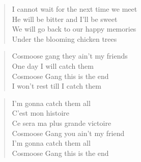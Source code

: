 \begin{verse}
I cannot wait for the next time we meet\\
He will be bitter and I'll be sweet\\
We will go back to our happy memories\\
Under the blooming chicken trees
\end{verse}

\begin{verse}
Cosmoose gang they ain't my friends\\
One day I will catch them\\
Cosmoose Gang this is the end\\
I won't rest till I catch them
\end{verse}

\begin{verse}
I'm gonna catch them all\\
C'est mon histoire\\
Ce sera ma plus grande victoire\\
Cosmoose Gang you ain't my friend\\
I'm gonna catch them all \\
Cosmoose Gang this is the end
\end{verse}

\clearpage


